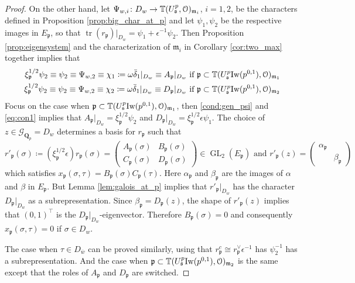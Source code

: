 \documentclass[leqno]{amsart}
\theoremstyle{definition}
\theoremstyle{remark}
\newcommand{\eo}{\EuScript{O}}
\newcommand{\Qp}{\mathbf{Q}_p}
\DeclareMathOperator{\GL}{GL}
\DeclareMathOperator{\mtr}{tr}
\newcommand{\fm}{\mathfrak{m}}
\newcommand{\fp}{\mathfrak{p}}
\newcommand{\fs}{\mathfrak{s}}
\newcommand{\Gp}{\mathcal{G}_{\Qp}} %
\newcommand{\bw}{{\overline{w}}}
\newcommand{\Iw}{\textnormal{Iw}} %
\newcommand{\TT}{\mathbb{T}} %
\begin{document}
\begin{proof}
On the other hand, 
let $\Psi_{w,i}\colon D_{w}\to \TT(U^p_\fs,\eo)_{\fm_i}$,
$i=1,2$, be the characters defined in Proposition 
\ref{prop:big_char_at_p}
and let $\psi_{1},\psi_2$ be the respective images in $E_\fp$,
so that $\mtr(r_\fp)\vert_{D_{w}}=\psi_1+\epsilon^{-1}\psi_2$.
Then Proposition \ref{prop:eigensystem}
and the characterization of $\fm_i$ in 
Corollary \ref{cor:two_max} together implies that
\begin{align}
\xi_\fp^{1/2}\psi_2\equiv\psi_2
\equiv\Psi_{w,2}\equiv 
\chi_1\coloneqq 
\omega\bar{\delta}_1\vert_{D_{w}}\equiv A_\fp\vert_{D_{w}}
\text{ if }
\fp\subset \TT(U^p_\fs\Iw(p^{0,1}),\eo)_{\fm_1}
\label{eq:con1}\\
\xi_\fp^{1/2}\psi_2\equiv\psi_2
\equiv\Psi_{w,2}\equiv 
\chi_2\coloneqq 
\omega\bar{\delta}_1\vert_{D_{w}}\equiv D_\fp\vert_{D_{w}}
\text{ if }
\fp\subset \TT(U^p_\fs\Iw(p^{0,1}),\eo)_{\fm_2}
\end{align}
Focus on the case when
$\fp\subset \TT(U^p_\fs\Iw(p^{0,1}),\eo)_{\fm_1}$,
then \eqref{cond:gen_psi} and \eqref{eq:con1}
implies that 
$A_\fp\vert_{D_{w}}=\xi_\fp^{1/2}\psi_2$ and
$D_\fp\vert_{D_{w}}=\xi_\fp^{1/2}\epsilon\psi_1$.
The choice of $z\in\Gp=D_w$
determines a basis for $r_\fp$ such that
\[
    r'_\fp(\sigma)\coloneqq
    (\xi_\fp^{1/2}\epsilon)r_\fp(\sigma)=
    \begin{pmatrix}
        A_\fp(\sigma) & B_\fp(\sigma)\\
        C_\fp(\sigma) & D_\fp(\sigma)
    \end{pmatrix}
    \in \GL_2(E_\fp) \text{ and }
    r'_\fp(z)=
    \begin{pmatrix}
        \alpha_\fp & \\
        & \beta_\fp
    \end{pmatrix}
\]
which satisfies $x_\fp(\sigma,\tau)=B_\fp(\sigma)C_\fp(\tau)$.
Here $\alpha_\fp$ and $\beta_\fp$
are the images of $\alpha$ and $\beta$ in $E_\fp$.
But Lemma \ref{lem:galois_at_p}
implies that $r'_\fp\vert_{D_{w}}$
has the character $D_\fp\vert_{D_{w}}$
as a subrepresentation.
Since $\beta_\fp=D_\fp(z)$,
the shape of $r'_\fp(z)$ implies that $(0,1)^\intercal$ is
the $D_\fp\vert_{D_w}$-eigenvector.
Therefore $B_\fp(\sigma)=0$
and consequently $x_\fp(\sigma,\tau)=0$ if $\sigma\in D_w$.


The case when $\tau\in D_{\bw}$
can be proved similarly,
using that $r_\fp^c\cong r_\fp^\vee\epsilon^{-1}$
has $\psi_2^{-1}$ has a subrepresentation.
And the case when 
$\fp\subset \TT(U^p_\fs\Iw(p^{0,1}),\eo)_{\fm_2}$
is the same except that the roles
of $A_\fp$ and $D_\fp$ are switched.

\end{proof}
\end{document}
